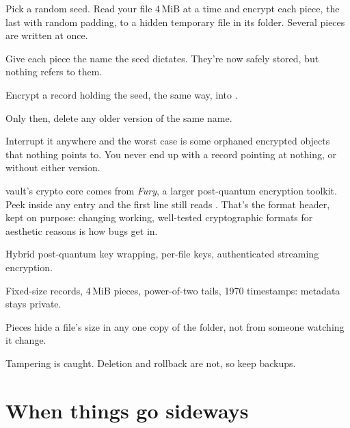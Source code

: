 \documentclass[10pt,oneside,openany]{book}
\begin{document}
\begin{steps}
  \item Pick a random seed. Read your file 4\,MiB at a time and encrypt each
        piece, the last with random padding, to a hidden temporary file in
        its  folder. Several pieces are written at once.
  \item Give each piece the name the seed dictates. They're now safely
        stored, but nothing refers to them.
  \item Encrypt a record holding the seed, the same way, into .
  \item Only then, delete any older version of the same name.
\end{steps}

Interrupt it anywhere and the worst case is some orphaned encrypted objects
that nothing points to. You never end up with a record pointing at nothing, or
without either version.

\begin{squirrel}
vault's crypto core comes from \emph{Fury}, a larger post-quantum encryption
toolkit. Peek inside any entry and the first line still reads
. That's the format header, kept on purpose:
changing working, well-tested cryptographic formats for aesthetic reasons
is how bugs get in.
\end{squirrel}

\begin{pocket}
\begin{pocketlist}
  \item Hybrid post-quantum key wrapping, per-file keys, authenticated streaming encryption.
  \item Fixed-size records, 4\,MiB pieces, power-of-two tails, 1970 timestamps: metadata stays private.
  \item Pieces hide a file's size in any one copy of the folder, not from someone watching it change.
  \item Tampering is caught. Deletion and rollback are not, so keep backups.
\end{pocketlist}
\end{pocket}

\chapter{When things go sideways}
\end{document}
